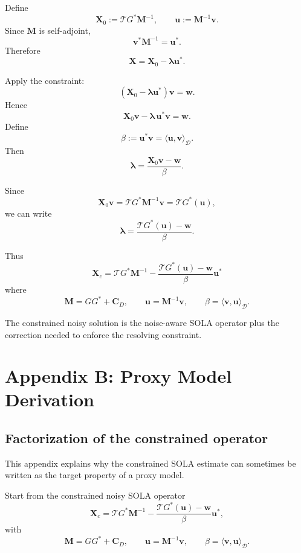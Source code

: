 \documentclass[11pt,openany]{book}
\theoremstyle{definition}
\theoremstyle{remark}
\newcommand{\D}{\mathcal D}
\newcommand{\Tau}{\mathcal{T}}
\begin{document}
Define
\[
  \mathbf X_0:=\Tau G^*\mathbf M^{-1},
  \qquad
  \mathbf u:=\mathbf M^{-1}\mathbf v.
\]
Since \(\mathbf M\) is self-adjoint,
\[
  \mathbf v^*\mathbf M^{-1}=\mathbf u^*.
\]
Therefore
\[
  \mathbf X
  =
  \mathbf X_0-\boldsymbol\lambda\mathbf u^*.
\]

Apply the constraint:
\[
  (\mathbf X_0-\boldsymbol\lambda\mathbf u^*)\mathbf v=\mathbf w.
\]
Hence
\[
  \mathbf X_0\mathbf v-\boldsymbol\lambda\,\mathbf u^*\mathbf v=\mathbf w.
\]
Define
\[
  \beta
  :=
  \mathbf u^*\mathbf v
  =
  \langle \mathbf u,\mathbf v\rangle_{\D}.
\]
Then
\[
  \boldsymbol\lambda
  =
  \frac{\mathbf X_0\mathbf v-\mathbf w}{\beta}.
\]

Since
\[
  \mathbf X_0\mathbf v
  =
  \Tau G^*\mathbf M^{-1}\mathbf v
  =
  \Tau G^*(\mathbf u),
\]
we can write
\[
  \boldsymbol\lambda
  =
  \frac{\Tau G^*(\mathbf u)-\mathbf w}{\beta}.
\]

Thus
\[
  \boxed{
  \mathbf X_c
  =
  \Tau G^*\mathbf M^{-1}
  -
  \frac{\Tau G^*(\mathbf u)-\mathbf w}{\beta}
  \mathbf u^*
  }
\]
where
\[
  \mathbf M=GG^*+\mathbf C_D,
  \qquad
  \mathbf u=\mathbf M^{-1}\mathbf v,
  \qquad
  \beta=\langle \mathbf v,\mathbf u\rangle_{\D}.
\]

\begin{lessonbox}
The constrained noisy solution is the noise-aware SOLA operator plus the correction needed to
enforce the resolving constraint.
\end{lessonbox}


\chapter{Appendix B: Proxy Model Derivation}

\section{Factorization of the constrained operator}

This appendix explains why the constrained SOLA estimate can sometimes be written as the
target property of a proxy model.

Start from the constrained noisy SOLA operator
\[
  \mathbf X_c
  =
  \Tau G^*\mathbf M^{-1}
  -
  \frac{\Tau G^*(\mathbf u)-\mathbf w}{\beta}
  \mathbf u^*,
\]
with
\[
  \mathbf M=GG^*+\mathbf C_D,
  \qquad
  \mathbf u=\mathbf M^{-1}\mathbf v,
  \qquad
  \beta=\langle \mathbf v,\mathbf u\rangle_{\D}.
\]
\end{document}

